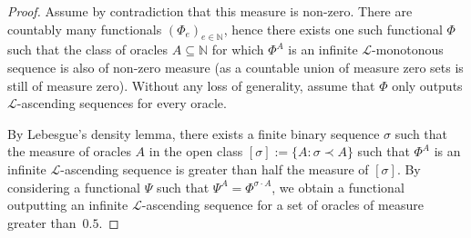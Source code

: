 \documentclass{article}
\numberwithin{theorem}{section}
\newtheorem{proposition}[theorem]{Proposition}
\newcommand{\ludovic}[1]{\textcolor{blue}{#1}}
\def\L{\mathcal{L}}
\newcommand{\NN}[0]{\mathbb{N}}
\begin{document}
\begin{proof}
Assume by contradiction that this measure is non-zero. There are countably many functionals $(\Phi_e)_{e \in \NN}$, hence there exists one such functional $\Phi$ such that the class of oracles $A \subseteq \NN$ for which $\Phi^A$ is an infinite $\L$-monotonous sequence is also of non-zero measure (as a countable union of measure zero sets is still of measure zero). Without any loss of generality, assume that $\Phi$ only outputs $\L$-ascending sequences for every oracle.

By Lebesgue's density lemma, there exists a finite binary sequence $\sigma$ such that the measure of oracles $A$ in the open class $[\sigma] := \{A : \sigma \prec A\}$ such that $\Phi^A$ is an infinite $\L$-ascending sequence is greater than half the measure of $[\sigma]$. By considering a functional $\Psi$ such that $\Psi^A = \Phi^{\sigma\cdot A}$, we obtain a functional outputting an infinite $\L$-ascending sequence for a set of oracles of measure greater than~$0.5$.


\end{proof}
\end{document}
